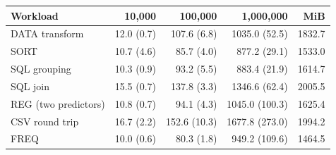 \begin{tabular}{lrrrr}
\toprule
Workload & 10,000 & 100,000 & 1,000,000 & MiB \\
\midrule
DATA transform & 12.0 (0.7) & 107.6 (6.8) & 1035.0 (52.5) & 1832.7 \\
SORT & 10.7 (4.6) & 85.7 (4.0) & 877.2 (29.1) & 1533.0 \\
SQL grouping & 10.3 (0.9) & 93.2 (5.5) & 883.4 (21.9) & 1614.7 \\
SQL join & 15.5 (0.7) & 137.8 (3.3) & 1346.6 (62.4) & 2005.5 \\
REG (two predictors) & 10.8 (0.7) & 94.1 (4.3) & 1045.0 (100.3) & 1625.4 \\
CSV round trip & 16.7 (2.2) & 152.6 (10.3) & 1677.8 (273.0) & 1994.2 \\
FREQ & 10.0 (0.6) & 80.3 (1.8) & 949.2 (109.6) & 1464.5 \\
\bottomrule
\end{tabular}
